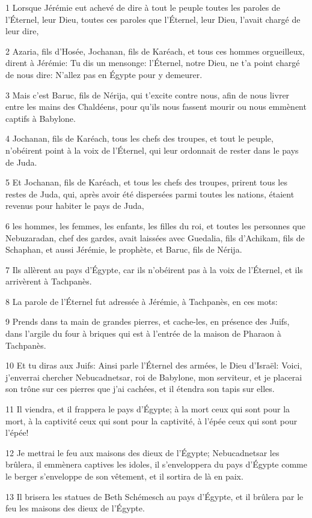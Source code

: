 \par 1 Lorsque Jérémie eut achevé de dire à tout le peuple toutes les paroles de l'Éternel, leur Dieu, toutes ces paroles que l'Éternel, leur Dieu, l'avait chargé de leur dire,
\par 2 Azaria, fils d'Hosée, Jochanan, fils de Karéach, et tous ces hommes orgueilleux, dirent à Jérémie: Tu dis un mensonge: l'Éternel, notre Dieu, ne t'a point chargé de nous dire: N'allez pas en Égypte pour y demeurer.
\par 3 Mais c'est Baruc, fils de Nérija, qui t'excite contre nous, afin de nous livrer entre les mains des Chaldéens, pour qu'ils nous fassent mourir ou nous emmènent captifs à Babylone.
\par 4 Jochanan, fils de Karéach, tous les chefs des troupes, et tout le peuple, n'obéirent point à la voix de l'Éternel, qui leur ordonnait de rester dans le pays de Juda.
\par 5 Et Jochanan, fils de Karéach, et tous les chefs des troupes, prirent tous les restes de Juda, qui, après avoir été dispersées parmi toutes les nations, étaient revenus pour habiter le pays de Juda,
\par 6 les hommes, les femmes, les enfants, les filles du roi, et toutes les personnes que Nebuzaradan, chef des gardes, avait laissées avec Guedalia, fils d'Achikam, fils de Schaphan, et aussi Jérémie, le prophète, et Baruc, fils de Nérija.
\par 7 Ils allèrent au pays d'Égypte, car ils n'obéirent pas à la voix de l'Éternel, et ils arrivèrent à Tachpanès.
\par 8 La parole de l'Éternel fut adressée à Jérémie, à Tachpanès, en ces mots:
\par 9 Prends dans ta main de grandes pierres, et cache-les, en présence des Juifs, dans l'argile du four à briques qui est à l'entrée de la maison de Pharaon à Tachpanès.
\par 10 Et tu diras aux Juifs: Ainsi parle l'Éternel des armées, le Dieu d'Israël: Voici, j'enverrai chercher Nebucadnetsar, roi de Babylone, mon serviteur, et je placerai son trône sur ces pierres que j'ai cachées, et il étendra son tapis sur elles.
\par 11 Il viendra, et il frappera le pays d'Égypte; à la mort ceux qui sont pour la mort, à la captivité ceux qui sont pour la captivité, à l'épée ceux qui sont pour l'épée!
\par 12 Je mettrai le feu aux maisons des dieux de l'Égypte; Nebucadnetsar les brûlera, il emmènera captives les idoles, il s'enveloppera du pays d'Égypte comme le berger s'enveloppe de son vêtement, et il sortira de là en paix.
\par 13 Il brisera les statues de Beth Schémesch au pays d'Égypte, et il brûlera par le feu les maisons des dieux de l'Égypte.

